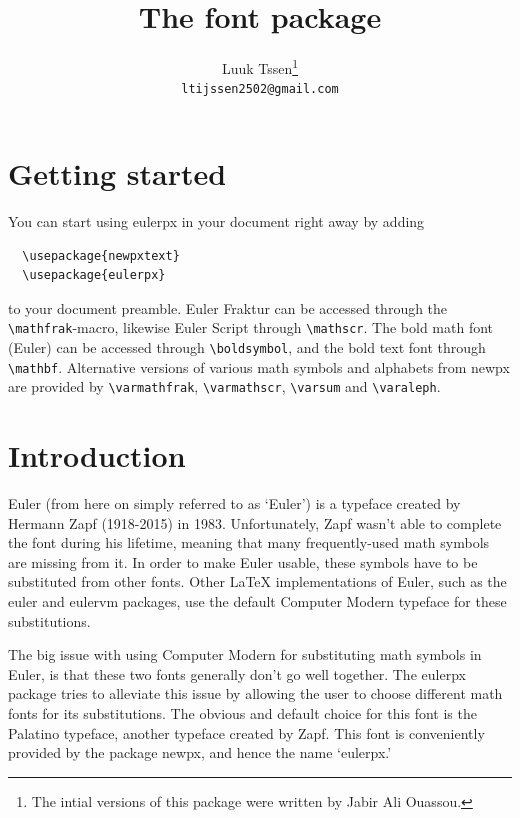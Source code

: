 \documentclass[11pt,a4paper,english]{article}
\title{The \pkg{eulerpx} font package}
\author{%
  Luuk T\ij ssen\thanks{%
    The intial versions of this package were written by Jabir Ali Ouassou.
  }\\
  \nolinkurl{ltijssen2502@gmail.com}%
}
\newcommand*\pkg[1]{{\sf #1}}
\newcommand*\cs[1]{{\tt\textbackslash #1}}
\begin{document}
\maketitle

\section*{Getting started}
You can start using \pkg{eulerpx} in your document right away by adding
\begin{verbatim}
  \usepackage{newpxtext}
  \usepackage{eulerpx}
\end{verbatim}
to your document preamble.
Euler Fraktur can be accessed through the \cs{mathfrak}-macro, likewise Euler Script through \cs{mathscr}.
The bold math font (Euler) can be accessed through \cs{boldsymbol}, and the bold text font through \cs{mathbf}.
Alternative versions of various math symbols and alphabets from \pkg{newpx} are provided by \cs{varmathfrak}, \cs{varmathscr}, \cs{varsum} and \cs{varaleph}.


\section{Introduction}
\AmS{} Euler (from here on simply referred to as `Euler') is a typeface created by Hermann Zapf (1918-2015) in 1983.
Unfortunately, Zapf wasn't able to complete the font during his lifetime, meaning that many frequently-used math symbols are missing from it.
In order to make Euler usable, these symbols have to be substituted from other fonts.
Other \LaTeX{} implementations of Euler, such as the \pkg{euler} and \pkg{eulervm} packages, use the default Computer Modern typeface for these substitutions.

The big issue with using Computer Modern for substituting math symbols in Euler, is that these two fonts generally don't go well together.
The \pkg{eulerpx} package tries to alleviate this issue by allowing the user to choose different math fonts for its substitutions.
The obvious and default choice for this font is the Palatino typeface, another typeface created by Zapf.
This font is conveniently provided by the package \pkg{newpx}, and hence the name `eulerpx.'
\end{document}
